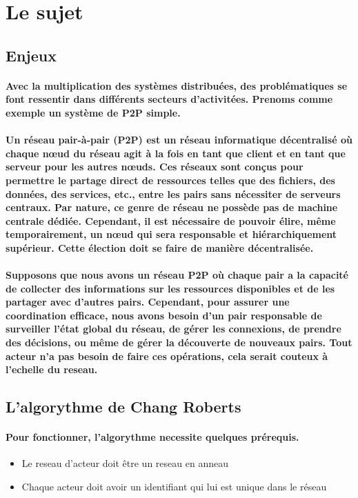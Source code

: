 \documentclass[12pt]{article}
\begin{document}
\section{Le sujet}
\subsection{Enjeux}
\paragraph{Avec la multiplication des systèmes distribuées, des problématiques se font ressentir dans différents secteurs d'activitées. Prenoms comme exemple un système de P2P simple.}
\paragraph{Un réseau pair-à-pair (P2P) est un réseau informatique décentralisé où chaque nœud du réseau agit à la fois en tant que client et en tant que serveur pour les autres nœuds. Ces réseaux sont conçus pour permettre le partage direct de ressources telles que des fichiers, des données, des services, etc., entre les pairs sans nécessiter de serveurs centraux. Par nature, ce genre de réseau ne possède pas de machine centrale dédiée. Cependant, il est nécessaire de pouvoir élire, même temporairement, un nœud qui sera responsable et hiérarchiquement supérieur. Cette élection doit se faire de manière décentralisée.}
\paragraph{Supposons que nous avons un réseau P2P où chaque pair a la capacité de collecter des informations sur les ressources disponibles et de les partager avec d'autres pairs. Cependant, pour assurer une coordination efficace, nous avons besoin d'un pair responsable de surveiller l'état global du réseau, de gérer les connexions, de prendre des décisions, ou même de gérer la découverte de nouveaux pairs. Tout acteur n'a pas besoin de faire ces opérations, cela serait couteux à l'echelle du reseau.}

\subsection{L'algorythme de Chang Roberts}
\paragraph{Pour fonctionner, l'algorythme necessite quelques prérequis.}
\begin{itemize}
    \item Le reseau d'acteur doit être un reseau en anneau
    \item Chaque acteur doit avoir un identifiant qui lui est unique dans le réseau
\end{itemize}
\end{document}
